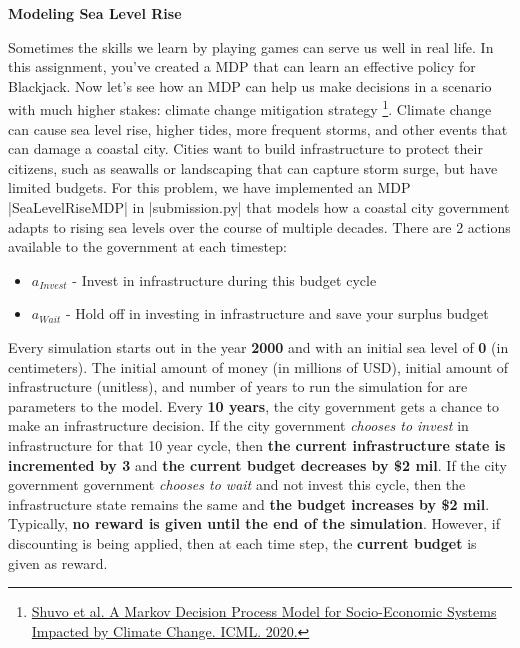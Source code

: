 \item {\bf Modeling Sea Level Rise}

Sometimes the skills we learn by playing games can serve us well in real life. In this assignment, 
you’ve created a MDP that can learn an effective policy for Blackjack. Now let’s see how an MDP can help us make decisions in a scenario with much higher stakes: climate change mitigation strategy \footnote{\href{https://proceedings.mlr.press/v119/shuvo20a.html}{Shuvo et al. A Markov Decision Process Model for Socio-Economic Systems Impacted by Climate Change. ICML. 2020.}}. 
Climate change can cause sea level rise, higher tides, more frequent storms, and other events that can damage a coastal city. 
Cities want to build infrastructure to protect their citizens, such as seawalls or landscaping that can capture storm surge, but have limited budgets.
For this problem, we have implemented an MDP |SeaLevelRiseMDP| in |submission.py| that models how a coastal city government adapts to rising sea levels over the course of multiple decades. There are 2 actions available to the government at each timestep: \\

\begin{itemize}
    \item $a_{Invest}$ - Invest in infrastructure during this budget cycle
    \item $a_{Wait}$ - Hold off in investing in infrastructure and save your surplus budget
\end{itemize}

Every simulation starts out in the year \textbf{2000} and with an initial sea level of \textbf{0} (in centimeters). The initial amount of money (in millions of USD), initial amount of infrastructure (unitless), and number of years to run the simulation for are parameters to the model. Every \textbf{10 years}, the city government gets a chance to make an infrastructure decision. If the city government \textit{chooses to invest} in infrastructure for that 10 year cycle, then \textbf{the current infrastructure state is incremented by 3} and \textbf{the current budget decreases by \$2 mil}. If the city government government \textit{chooses to wait} and not invest this cycle, then the infrastructure state remains the same and \textbf{the budget increases by \$2 mil}. Typically, \textbf{no reward is given until the end of the simulation}. However, if discounting is being applied, then at each time step, the \textbf{current budget} is given as reward. \\

